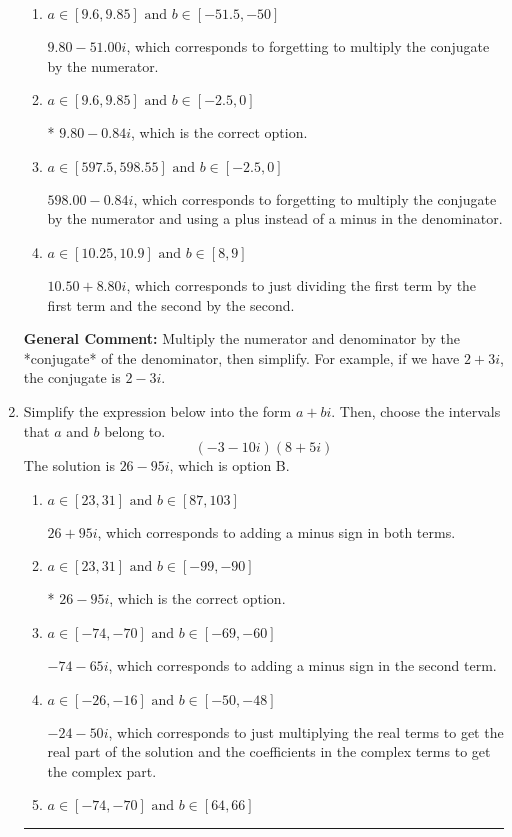\documentclass{extbook}[14pt]
\newcommand{\litem}[1]{\item #1

\rule{\textwidth}{0.4pt}}
\begin{document}
\begin{enumerate}
{\begin{enumerate}[label=\Alph*.]
 $2.59  + 9.49 i$, which corresponds to forgetting to multiply the conjugate by the numerator and not computing the conjugate correctly.
\item \( a \in [9.6, 9.85] \text{ and } b \in [-51.5, -50] \)

 $9.80  - 51.00 i$, which corresponds to forgetting to multiply the conjugate by the numerator.
\item \( a \in [9.6, 9.85] \text{ and } b \in [-2.5, 0] \)

* $9.80  - 0.84 i$, which is the correct option.
\item \( a \in [597.5, 598.55] \text{ and } b \in [-2.5, 0] \)

 $598.00  - 0.84 i$, which corresponds to forgetting to multiply the conjugate by the numerator and using a plus instead of a minus in the denominator.
\item \( a \in [10.25, 10.9] \text{ and } b \in [8, 9] \)

 $10.50  + 8.80 i$, which corresponds to just dividing the first term by the first term and the second by the second.
\end{enumerate}

\textbf{General Comment:} Multiply the numerator and denominator by the *conjugate* of the denominator, then simplify. For example, if we have $2+3i$, the conjugate is $2-3i$.
}
\litem{
Simplify the expression below into the form $a+bi$. Then, choose the intervals that $a$ and $b$ belong to.
\[ (-3 - 10 i)(8 + 5 i) \]The solution is \( 26 - 95 i \), which is option B.\begin{enumerate}[label=\Alph*.]
\item \( a \in [23, 31] \text{ and } b \in [87, 103] \)

 $26 + 95 i$, which corresponds to adding a minus sign in both terms.
\item \( a \in [23, 31] \text{ and } b \in [-99, -90] \)

* $26 - 95 i$, which is the correct option.
\item \( a \in [-74, -70] \text{ and } b \in [-69, -60] \)

 $-74 - 65 i$, which corresponds to adding a minus sign in the second term.
\item \( a \in [-26, -16] \text{ and } b \in [-50, -48] \)

 $-24 - 50 i$, which corresponds to just multiplying the real terms to get the real part of the solution and the coefficients in the complex terms to get the complex part.
\item \( a \in [-74, -70] \text{ and } b \in [64, 66] \)


\end{enumerate}}
\end{enumerate}
\end{document}
